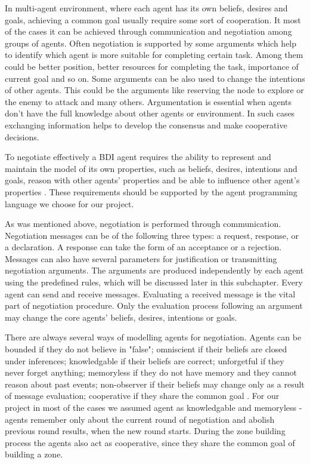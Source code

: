 In multi-agent environment, where each agent has its own beliefs, desires and goals, achieving a common goal usually require some sort of cooperation. It most of the cases it can be achieved through communication and negotiation among groups of agents. Often negotiation is supported by some arguments which help to identify which agent is more suitable for completing certain task. Among them could be better position, better resources for completing the task, importance of current goal and so on. Some arguments can be also used to change the intentions of other agents. This could be the arguments like reserving the node to explore or the enemy to attack and many others. Argumentation is essential when agents don't have the full knowledge about other agents or environment. In such cases exchanging information helps to develop the consensus and make cooperative decisions.

To negotiate effectively a BDI agent requires the ability to represent and maintain the model of its own properties, such as beliefs, desires, intentions and goals, reason with other agents' properties and be able to influence other agent's properties \cite{Kraus_98}. These requirements should be supported by the agent programming language we choose for our project. 

As was mentioned above, negotiation is performed through communication. Negotiation messages can be of the following three types: a request, response, or a declaration. A response can take the form of an acceptance or a rejection. Messages can also have several parameters for justification or transmitting negotiation arguments. The arguments are produced independently by each agent using the predefined rules, which will be discussed later in this subchapter. Every agent can send and receive messages. Evaluating a received message is the vital part of negotiation procedure. Only the evaluation process following an argument may change the core agents' beliefs, desires, intentions or goals. 

There are always several ways of modelling agents for negotiation. Agents can be bounded if they do not believe in "false"; omniscient if their beliefs are closed under inferences; knowledgable if  their beliefs are correct; unforgetful if they never forget anything; memoryless if they do not have memory and they cannot reason about past events; non-observer if their beliefs may change only as a result of message evaluation; cooperative if they share the common goal \cite{Kraus_98}. For our project in most of the cases we assumed agent as knowledgable and memoryless - agents remember only about the current round of negotiation and abolish previous round results, when the new round starts. During the zone building process the agents also act as cooperative, since they share the common goal of building a zone.

